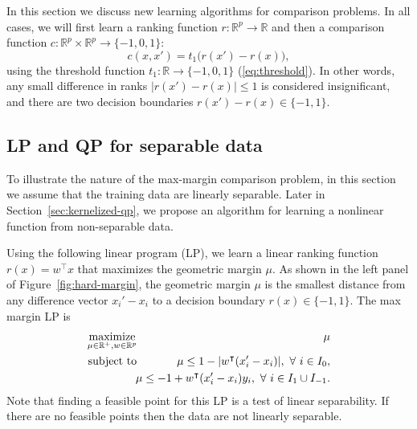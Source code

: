 \documentclass{article}
\newcommand{\RR}{\mathbb R}
\DeclareMathOperator*{\maximize}{maximize}
\begin{document}
In this section we discuss new learning algorithms for comparison
problems. In all cases, we will first learn a ranking function
$r:\RR^p\rightarrow\RR$ and then a comparison function $c:\RR^p\times
\RR^p\rightarrow\{-1,0,1\}$:
\begin{equation}
  \label{eq:compare_general}
  c(x,x')=t_1\big( r(x') - r(x) \big),
\end{equation}
using the threshold
function $t_1:\RR\rightarrow\{-1,0,1\}$ (\ref{eq:threshold}). 
In other
words, any small difference in ranks $|r(x')-r(x)|\leq 1$ is considered
insignificant, and there are two decision boundaries
$r(x')-r(x)\in\{-1,1\}$.

\subsection{LP and QP for separable data}
\label{sec:lp-qp}

To illustrate the nature of the max-margin comparison problem, in this
section we assume that the training data are linearly separable. Later
in Section~\ref{sec:kernelized-qp}, we propose an algorithm for
learning a nonlinear function from non-separable data.

Using the following linear program (LP), we learn a linear ranking
function $r(x)=w^\intercal x$ that maximizes the geometric margin
$\mu$. As shown in the left panel of Figure~\ref{fig:hard-margin}, the
geometric margin $\mu$ is the smallest distance from any difference
vector $x_i'-x_i$ to a decision boundary $r(x)\in\{-1,1\}$. 
The
 max margin LP is
\begin{eqnarray}
  \label{eq:max-margin-lp}
  \maximize_{\mu\in\RR^+, w\in\RR^p}\ &&\hskip -0.5cm \mu \\
\nonumber
    \text{subject to}\ && \hskip -0.5cm \mu \leq 1-|w^\intercal (x_i' - x_i)|,\ 
    \forall\  i\in I_0,\\
\nonumber
    &&\hskip -0.5cm
\mu \leq -1 +  w^\intercal(x_i'-x_i)y_i,\ \forall\ i\in I_1\cup I_{-1}.
\end{eqnarray}
Note that finding a feasible point for this LP is a test of linear
separability. If there are no feasible points then the data are not
linearly separable. 
\end{document}
